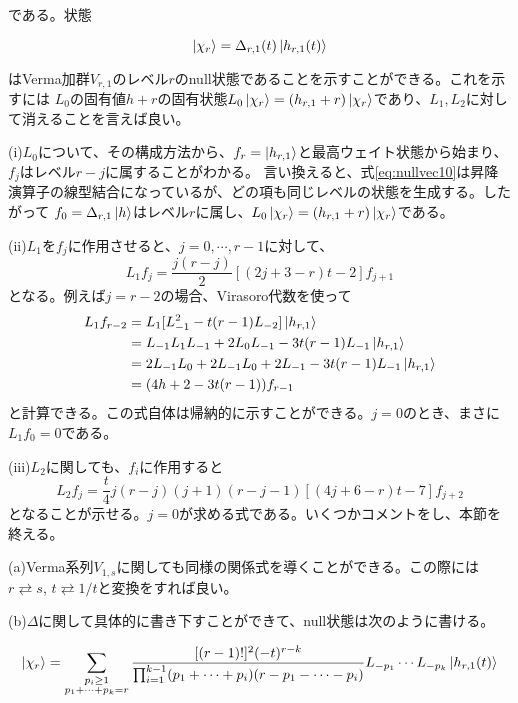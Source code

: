 \documentclass[11pt, aps, longbibliography]{article}
\numberwithin{equation}{section}
\begin{document}
    である。状態
    \begin{tcolorbox}
        \begin{equation}\label{eq:nullvec11}
            \ket{\chi_r} = \Delta_{r,1}(t)\ket{h_{r,1}(t)}
        \end{equation}
    \end{tcolorbox}
    はVerma加群$V_{r,1}$のレベル$r$のnull状態であることを示すことができる。これを示すには
    $L_0$の固有値$h+r$の固有状態$L_0\ket{\chi_r}=(h_{r,1}+r)\ket{\chi_r}$であり、$L_1,L_2$に対して消えることを言えば良い。
    
    (i)$L_0$について、その構成方法から、$f_r = \ket{h_{r,1}}$と最高ウェイト状態から始まり、$f_j$はレベル$r-j$に属することがわかる。
    言い換えると、式\eqref{eq:nullvec10}は昇降演算子の線型結合になっているが、どの項も同じレベルの状態を生成する。したがって
    $f_0 = \Delta_{r,1}\ket{h}$はレベル$r$に属し、$L_0\ket{\chi_r}=(h_{r,1}+r)\ket{\chi_r}$である。

    (ii)$L_1$を$f_j$に作用させると、$j=0,\cdots,r-1$に対して、
    \begin{equation}\label{eq:nullvec12}
        L_1f_j = \frac{j(r-j)}{2}[(2j+3-r)t-2]f_{j+1}
    \end{equation}
    となる。例えば$j=r-2$の場合、Virasoro代数を使って
    \begin{align}\label{eq:nullvec13}
        L_1f_{r-2} &= L_1 [L_{-1}^2 -t(r-1) L_{-2}]\ket{h_{r,1}} \notag \\
        &= L_{-1}L_1L_{-1} + 2L_{0}L_{-1} -3t(r-1)L_{-1}\ket{h_{r,1}} \notag \\
        &= 2L_{-1}L_0 + 2L_{-1}L_0 +2L_{-1} -3t(r-1) L_{-1}\ket{h_{r,1}} \notag \\
        &= (4h+2-3t(r-1))f_{r-1}
    \end{align}
    と計算できる。この式自体は帰納的に示すことができる。$j=0$のとき、まさに$L_1f_0 = 0$である。

    (iii)$L_2$に関しても、$f_i$に作用すると
    \begin{equation}\label{eq:nullvec14}
        L_2f_j = \frac{t}{4}j(r-j)(j+1)(r-j-1)\left[ (4j+6-r)t -7 \right]f_{j+2}
    \end{equation}
    となることが示せる。$j=0$が求める式である。いくつかコメントをし、本節を終える。
    
    (a)Verma系列$V_{1,s}$に関しても同様の関係式を導くことができる。この際には$r \rightleftarrows s$, $t \rightleftarrows 1/t$と変換をすれば良い。
    
    (b)$\Delta$に関して具体的に書き下すことができて、null状態は次のように書ける。
    \begin{tcolorbox}
        \begin{equation}\label{eq:nullvec15}
            \ket{\chi_r} = \sum_{\substack{p_i \geq 1 \\ p_1 + \cdots + p_k = r }} \frac{[(r-1)!]^2(-t)^{r-k}}{\prod_{i=1}^{k-1}(p_1 + \cdots + p_i)(r-p_1-\cdots -p_i)} L_{-p_1} \cdots L_{-p_k} \ket{h_{r,1}(t)}
        \end{equation}
    \end{tcolorbox}
\end{document}
